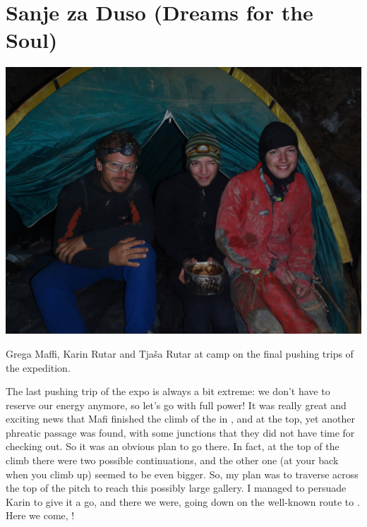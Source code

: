 \section{Sanje za Duso (Dreams for the Soul)}



\begin{pagefigure}
\checkoddpage \ifoddpage \forcerectofloat \else \forceversofloat \fi
   \centering
\includegraphics[width = \textwidth]{2012/sanje_za_duso/2012-08-13-1322-Maver-P8130192--orig.jpg}
\caption{Grega Maffi, Karin Rutar and Tjaša Rutar at camp  on the final pushing trips of the expedition. } \label{slovs x-ray pushing}
\end{pagefigure}



The last pushing trip of the expo is always a bit extreme: we don't have
to reserve our energy anymore, so let's go with full power! It was
really great and exciting news that Mafi finished the climb of the
 in , and at the top, yet
another phreatic passage was found, with some junctions that they did
not have time for checking out. So it was an obvious plan to go there.
In fact, at the top of the climb there were two possible continuations,
and the other one (at your back when you climb up) seemed to be even
bigger. So, my plan was to traverse across the top of the pitch to reach
this possibly large gallery. I managed to persuade Karin to give it a
go, and there we were, going down on the well-known route to
. Here we come, !

